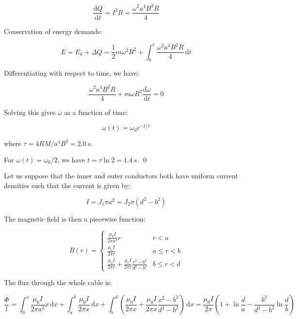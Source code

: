 \documentclass[12pt]{article}
\begin{document}
\begin{equation}
    \frac{\mathrm{d}Q}{\mathrm{d}t} = I^{2} R = \frac{\omega^{2} a^{4}B^{2}R}{4}
\end{equation}

Conservation of energy demands:

\begin{equation}
    E = E_{k} + \Delta Q = \frac{1}{2}m\omega^{2}R^{2} + \int_{0}^{t} \frac{\omega^{2} a^{4}B^{2}R}{4} \, \mathrm{d}t
\end{equation}

Differentiating with respect to time, we have:

\begin{equation}
    \frac{\omega^{2} a^{4}B^{2}R}{4} + m\omega R^{2} \frac{\mathrm{d}\omega}{\mathrm{d}t} = 0
\end{equation}

Solving this gives $\omega$ as a function of time:

\begin{equation}
    \omega(t) = \omega_{0} e^{-t/\tau}
\end{equation}

where $\tau = 4RM/a^{4}B^{2} = \qty{2.0}{s}$.

For $\omega(t) = \omega_{0}/2$, we have $t = \tau \ln{2} = \qty{1.4}{s}$.
\qed


Let us suppose that the inner and outer conductors both have uniform current densities such that the current is given by:

\begin{equation}
    I = J_{1} \pi a^{2} = J_{2} \pi (d^{2} - b^{2})
\end{equation}

The magnetic field is then a piecewise function:

\begin{equation}
    B(r) = 
    \begin{cases}
        \frac{\mu_{0}I}{2\pi a^{2}} r & r < a \\
        \frac{\mu_{0}I}{2\pi r} & a \le r < b \\
        \frac{\mu_{0}I}{2\pi r} + \frac{\mu_{0}I}{2\pi r} \frac{r^{2} - b^{2}}{d^{2} - b^{2}} & b \le r < d
    \end{cases}
\end{equation}

The flux through the whole cable is:

\begin{equation}
    \frac{\Phi}{l} = \int_{0}^{a} \frac{\mu_{0}I}{2\pi a^{2}} x \, \mathrm{d}x + \int_{a}^{b} \frac{\mu_{0}I}{2\pi x} \, \mathrm{d}x + \int_{b}^{d} \left( \frac{\mu_{0}I}{2\pi x} + \frac{\mu_{0}I}{2\pi x} \frac{x^{2} - b^{2}}{d^{2} - b^{2}} \right) \, \mathrm{d}x = \frac{\mu_{0}I}{2\pi} \left( 1 + \ln{\frac{d}{a}} - \frac{b^{2}}{d^{2} - b^{2}} \ln{\frac{d}{b}} \right)
\end{equation}
\end{document}
